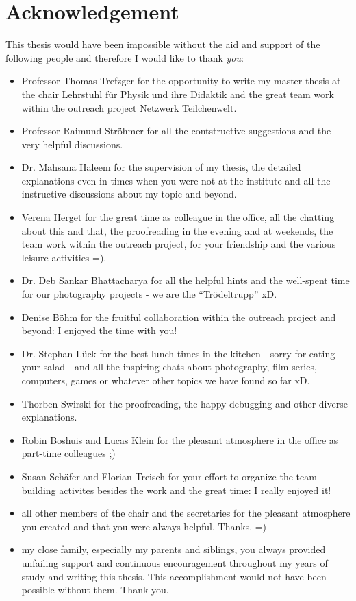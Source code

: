 \chapter*{Acknowledgement}
This thesis would have been impossible without the aid and support of the following people and therefore I would like to thank \textit{you}:
\begin{itemize}
 \item Professor Thomas Trefzger for the opportunity to write my master thesis at the chair Lehrstuhl f\"{u}r Physik und ihre Didaktik and the great team work within the outreach project Netzwerk Teilchenwelt.
 \item Professor Raimund Str\"{o}hmer for all the contstructive suggestions and the very helpful discussions.
 \item Dr. Mahsana Haleem for the supervision of my thesis, the detailed explanations even in times when you were not at the institute and all the instructive discussions about my topic and beyond.
 \item Verena Herget for the great time as colleague in the office, all the chatting about this and that, the proofreading in the evening and at weekends, the team work within the outreach project, for your friendship and the various leisure activities =). 
 \item Dr. Deb Sankar Bhattacharya for all the helpful hints and the well-spent time for our photography projects - we are the ``Tr\"{o}deltrupp'' xD.
 \item Denise B\"{o}hm for the fruitful collaboration within the outreach project and beyond: I enjoyed the time with you!
 \item Dr. Stephan L\"{u}ck for the best lunch times in the kitchen - sorry for eating your salad - and all the inspiring chats about photography, film series, computers, games or whatever other topics we have found so far xD.
 \item Thorben Swirski for the proofreading, the happy debugging and other diverse explanations. 
 \item Robin Boshuis and Lucas Klein for the pleasant atmosphere in the office as part-time colleagues ;)
 \item Susan Sch\"{a}fer and Florian Treisch for your effort to organize the team building activites besides the work and the great time: I really enjoyed it!
 \item all other members of the chair and the secretaries for the pleasant atmosphere you created and that you were always helpful. Thanks. =) 
 \item my close family, especially my parents and siblings, you always provided unfailing support and continuous encouragement throughout my years of study and writing this thesis. This accomplishment would not have been possible without them. Thank you. 
\end{itemize}

